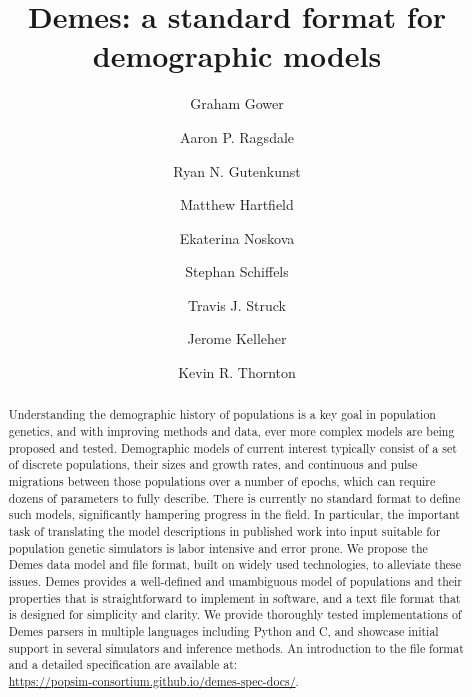 \documentclass[11pt]{article}
\begin{document}
\title{Demes: a standard format for demographic models}
\author[1,$\star$]{Graham Gower}
\author[2,$\star$]{Aaron P. Ragsdale}

\author[3]{Ryan N. Gutenkunst}
\author[4]{Matthew Hartfield}
\author[5]{Ekaterina Noskova}
\author[8]{Stephan Schiffels}
\author[3]{Travis J. Struck}
\author[6,$\dagger$,$\aleph$]{Jerome Kelleher}
\author[7,$\dagger$]{Kevin R. Thornton}




\maketitle

\begin{abstract}
Understanding the demographic history of populations is a
key goal in population genetics, and with improving methods
and data, ever more complex models are being proposed and tested.
Demographic models of current interest
typically consist of a set of discrete populations,
their sizes and growth rates, and continuous and pulse migrations
between those populations over a number of epochs, which can require
dozens of parameters to fully describe. There is currently
no standard format to define such models, significantly
hampering  progress in the field. In particular, the important
task of translating the model descriptions in published
work into input suitable for population genetic simulators is labor intensive
and error prone.
We propose the Demes data model and file format,
built on widely used technologies,
to alleviate these issues. Demes provides a well-defined and unambiguous
model of populations and their properties that is straightforward to
implement in software, and a text file format that is designed for
simplicity and clarity.
We provide thoroughly tested implementations of Demes parsers
in multiple languages including Python and C,
and showcase initial support in several simulators and inference
methods.
An introduction to the file format and a detailed specification are available at:\\
\url{https://popsim-consortium.github.io/demes-spec-docs/}.
\end{abstract}
\end{document}

